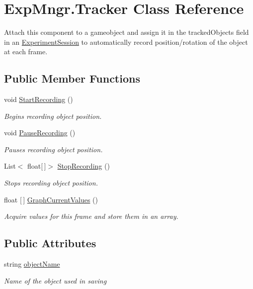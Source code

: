 \hypertarget{class_exp_mngr_1_1_tracker}{}\section{Exp\+Mngr.\+Tracker Class Reference}
\label{class_exp_mngr_1_1_tracker}


Attach this component to a gameobject and assign it in the tracked\+Objects field in an \hyperlink{class_exp_mngr_1_1_experiment_session}{Experiment\+Session} to automatically record position/rotation of the object at each frame.  


\subsection*{Public Member Functions}
\begin{DoxyCompactItemize}
\item 
void \hyperlink{class_exp_mngr_1_1_tracker_ab348a88372065d0129699242634b9b46}{Start\+Recording} ()
\begin{DoxyCompactList}\small\item\em Begins recording object position. \end{DoxyCompactList}\item 
void \hyperlink{class_exp_mngr_1_1_tracker_abe64e0b0e0a72a153e26ef65ef57a0f8}{Pause\+Recording} ()
\begin{DoxyCompactList}\small\item\em Pauses recording object position. \end{DoxyCompactList}\item 
List$<$ float\mbox{[}$\,$\mbox{]}$>$ \hyperlink{class_exp_mngr_1_1_tracker_a21a718555e14883f0e4cd49f99f4a1e4}{Stop\+Recording} ()
\begin{DoxyCompactList}\small\item\em Stops recording object position. \end{DoxyCompactList}\item 
float \mbox{[}$\,$\mbox{]} \hyperlink{class_exp_mngr_1_1_tracker_a01cbcbb5669063193cae992b79313344}{Graph\+Current\+Values} ()
\begin{DoxyCompactList}\small\item\em Acquire values for this frame and store them in an array. \end{DoxyCompactList}\end{DoxyCompactItemize}
\subsection*{Public Attributes}
\begin{DoxyCompactItemize}
\item 
string \hyperlink{class_exp_mngr_1_1_tracker_a516bea7fe82223da292686f1dc4eadcc}{object\+Name}
\begin{DoxyCompactList}\small\item\em Name of the object used in saving \end{DoxyCompactList}\end{DoxyCompactItemize}
